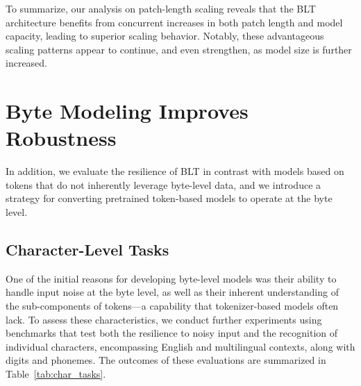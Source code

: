 To summarize, our analysis on patch-length scaling reveals that the {\textsc BLT} architecture benefits from concurrent increases in both patch length and model capacity, leading to superior scaling behavior. Notably, these advantageous scaling patterns appear to continue, and even strengthen, as model size is further increased.

\section{Byte Modeling Improves Robustness} In addition, we evaluate the resilience of {\textsc BLT} in contrast with models based on tokens that do not inherently leverage byte-level data, and we introduce a strategy for converting pretrained token-based models to operate at the byte level.
\label{sec:robustness}

\subsection{Character-Level Tasks}

One of the initial reasons for developing byte-level models was their ability to handle input noise at the byte level, as well as their inherent understanding of the sub-components of tokens—a capability that tokenizer-based models often lack. To assess these characteristics, we conduct further experiments using benchmarks that test both the resilience to noisy input and the recognition of individual characters, encompassing English and multilingual contexts, along with digits and phonemes. The outcomes of these evaluations are summarized in Table~\ref{tab:char_tasks}.

